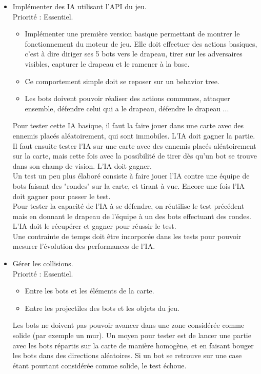 \begin{itemize}
        \item Implémenter des IA utilisant l'API du jeu. \\
            Priorité : Essentiel.
            \begin{itemize}
                \item Implémenter une première version basique permettant de montrer le fonctionnement du moteur de jeu. Elle doit effectuer des actions basiques, c'est à dire diriger ses 5 bots vers le drapeau,
                tirer sur les adversaires visibles, capturer le drapeau et le ramener à la base.
                \item Ce comportement simple doit se reposer sur un behavior tree\cite{colledanchise2017behavior}.
                \item Les bots doivent pouvoir réaliser des actions communes, attaquer ensemble, défendre celui qui a le drapeau, défendre le drapeau ... \\
            \end{itemize}
            Pour tester cette IA basique, il faut la faire jouer dans une carte avec des ennemis placés aléatoirement, qui sont immobiles. L'IA doit gagner la partie.\\
            Il faut ensuite tester l'IA sur une carte avec des ennemis placés aléatoirement sur la carte, mais cette fois avec la possibilité de tirer dès qu'un bot se trouve dans son champ de vision. L'IA doit gagner. \\
            Un test un peu plus élaboré consiste à faire jouer l'IA contre une équipe de bots faisant des "rondes" sur la carte, et tirant à vue. Encore une fois l'IA doit gagner pour passer le test.\\
            
            Pour tester la capacité de l'IA à se défendre, on réutilise le test précédent mais en donnant le drapeau de l'équipe à un des bots effectuant des rondes. L'IA doit le récupérer et gagner pour réussir le test.\\
            Une contrainte de temps doit être incorporée dans les tests pour pouvoir mesurer l'évolution des performances de l'IA. \\


        \item Gérer les collisions. \\
                Priorité : Essentiel.
                \begin{itemize}
                    \item Entre les bots et les éléments de la carte.
                    \item Entre les projectiles des bots et les objets du jeu.\\
                \end{itemize}
                Les bots ne doivent pas pouvoir avancer dans une zone considérée comme solide (par exemple un mur). Un moyen pour tester est de lancer une partie avec les bots répartis sur la carte de manière homogène, et en faisant bouger les bots dans des directions aléatoires. Si un bot se retrouve sur une case étant pourtant considérée comme solide, le test échoue.\\
                

\end{itemize}
